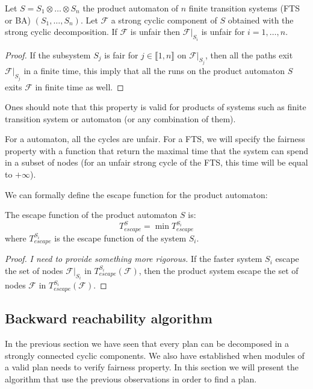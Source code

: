 \begin{prop}
Let $S = S_1 \otimes \dots \otimes S_n$ the product automaton of $n$ finite transition systems (FTS or BA) $(S_1,\dots,S_n)$.
Let $\mathcal{F}$ a strong cyclic component of $S$ obtained with the strong cyclic decomposition.
If $\mathcal{F}$ is unfair then $\mathcal{F}|_{S_i}$ is unfair for $i = 1,\dots,n$.
\end{prop}

\begin{proof}
If the subsystem $S_j$ is fair for $j \in \llbracket 1,n \rrbracket$ on $\mathcal{F}|_{S_j}$, then all the paths exit $\mathcal{F}|_{S_j}$ in a finite time, this imply that all the runs on the product automaton $S$ exits $\mathcal{F}$ in finite time as well.
\end{proof}

Ones should note that this property is valid for products of systems such as finite transition system or \buchi{} automaton (or any combination of them).

For a \buchi{} automaton, all the cycles are unfair.
For a FTS, we will specify the fairness property with a function that return the maximal time that the system can spend in a subset of nodes
(for an unfair strong cycle of the FTS, this time will be equal to $+\infty$).

We can formally define the escape function for the product automaton:
\begin{property}
The escape function of the product automaton $S$ is:
$$T_{escape}^S = \min{T_{escape}^{S_i}}$$
where $T_{escape}^{S_i}$ is the escape function of the system $S_i$.
\end{property}

\begin{proof}
\textit{I need to provide something more rigorous.}
If the faster system $S_i$ escape the set of nodes $\mathcal{F}|_{S_i}$ in $T^{S_i}_{escape}(\mathcal{F})$, then the product system escape the set of nodes $\mathcal{F}$ in $T^{S_i}_{escape}(\mathcal{F})$.
\end{proof}

\subsection{Backward reachability algorithm}
In the previous section we have seen that every plan can be decomposed in a strongly connected cyclic components.
We also have established when modules of a valid plan needs to verify fairness property.
In this section we will present the algorithm that use the previous observations in order to find a plan.

